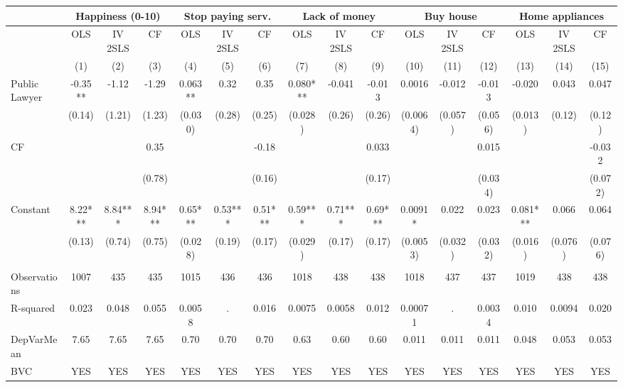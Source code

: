 \begin{tabular}{lccccccccccccccc}
\toprule
      & \multicolumn{3}{c}{Happiness (0-10)} & \multicolumn{3}{c}{Stop paying serv.} & \multicolumn{3}{c}{Lack of money} & \multicolumn{3}{c}{Buy house} & \multicolumn{3}{c}{Home appliances} \\
\midrule
\midrule
      & OLS   & IV 2SLS & CF    & OLS   & IV 2SLS & CF    & OLS   & IV 2SLS & CF    & OLS   & IV 2SLS & CF    & OLS   & IV 2SLS & CF \\
\midrule
      & (1)   & (2)   & (3)   & (4)   & (5)   & (6)   & (7)   & (8)   & (9)   & (10)  & (11)  & (12)  & (13)  & (14)  & (15) \\
\midrule
\midrule
Public Lawyer & -0.35** & -1.12 & -1.29 & 0.063** & 0.32  & 0.35  & 0.080*** & -0.041 & -0.013 & 0.0016 & -0.012 & -0.013 & -0.020 & 0.043 & 0.047 \\
      & (0.14) & (1.21) & (1.23) & (0.030) & (0.28) & (0.25) & (0.028) & (0.26) & (0.26) & (0.0064) & (0.057) & (0.056) & (0.013) & (0.12) & (0.12) \\
CF    &       &       & 0.35  &       &       & -0.18 &       &       & 0.033 &       &       & 0.015 &       &       & -0.032 \\
      &       &       & (0.78) &       &       & (0.16) &       &       & (0.17) &       &       & (0.034) &       &       & (0.072) \\
Constant  & 8.22*** & 8.84*** & 8.94*** & 0.65*** & 0.53*** & 0.51*** & 0.59*** & 0.71*** & 0.69*** & 0.0091* & 0.022 & 0.023 & 0.081*** & 0.066 & 0.064 \\
      & (0.13) & (0.74) & (0.75) & (0.028) & (0.19) & (0.17) & (0.029) & (0.17) & (0.17) & (0.0053) & (0.032) & (0.032) & (0.016) & (0.076) & (0.076) \\
      &       &       &       &       &       &       &       &       &       &       &       &       &       &       &  \\
\midrule
Observations & 1007  & 435   & 435   & 1015  & 436   & 436   & 1018  & 438   & 438   & 1018  & 437   & 437   & 1019  & 438   & 438 \\
R-squared & 0.023 & 0.048 & 0.055 & 0.0058 & .     & 0.016 & 0.0075 & 0.0058 & 0.012 & 0.00071 & .     & 0.0034 & 0.010 & 0.0094 & 0.020 \\
DepVarMean & 7.65  & 7.65  & 7.65  & 0.70  & 0.70  & 0.70  & 0.63  & 0.60  & 0.60  & 0.011 & 0.011 & 0.011 & 0.048 & 0.053 & 0.053 \\
BVC   & YES   & YES   & YES   & YES   & YES   & YES   & YES   & YES   & YES   & YES   & YES   & YES   & YES   & YES   & YES \\

\end{tabular}
